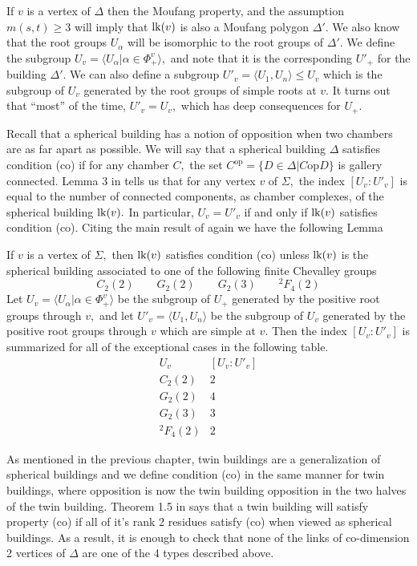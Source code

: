 \documentclass[class=book, crop=false,12 pt]{standalone}
\begin{document}
If $v$ is a vertex of $\Delta$ then the Moufang property, and the assumption $m(s,t)\ge 3$ will imply that $\mathrm{lk}(v)$ is also a Moufang polygon $\Delta'.$ We also know that the root groups $U_\alpha$ will be isomorphic to the root groups of $\Delta'.$ We define the subgroup $U_v=\langle U_\alpha|\alpha\in \Phi_+^v\rangle,$ and note that it is the corresponding $U'_+$ for the building $\Delta'.$ We can also define a subgroup $U'_v=\langle U_1,U_n\rangle\le U_v$ which is the subgroup of $U_v$ generated by the root groups of simple roots at $v.$ It turns out that ``most'' of the time, $U'_v=U_v,$ which has deep consequences for $U_+.$

Recall that a spherical building has a notion of opposition when two chambers are as far apart as possible. We will say that a spherical building $\Delta$ satisfies condition (co) if for any chamber $C,$ the set $C^\text{op}=\{D\in \Delta|C\mathrm{ op }D\}$ is gallery connected. Lemma 3 in \cite{cop} tells us that for any vertex $v$ of $\Sigma,$ the index $[U_v:U'_v]$ is equal to the number of connected components, as chamber complexes, of the spherical building $\mathrm{lk}(v).$ In particular, $U_v=U'_v$ if and only if $\mathrm{lk}(v)$ satisfies condition (co). Citing the main result of \cite{cop} again we have the following Lemma

\begin{lemma}
	\label{lem:index}
	If $v$ is a vertex of $\Sigma,$ then $\mathrm{lk}(v)$ satisfies condition (co) unless $\mathrm{lk}(v)$ is the spherical building associated to one of the following finite Chevalley groups
	\[
		C_2(2)\qquad G_2(2) \qquad G_2(3) \qquad {}^2F_4(2)
	\]
	Let $U_v=\langle U_\alpha|\alpha\in \Phi_+^v\rangle$ be the subgroup of $U_+$ generated by the positive root groups through $v,$ and let $U'_v=\langle U_1,U_n\rangle$ be the subgroup of $U_v$ generated by the positive root groups through $v$ which are simple at $v.$ Then the index $[U_v:U'_v]$ is summarized for all of the exceptional cases in the following table.
	\[
		\begin{array}{c|c}
			U_v&[U_v:U'_v]\\\hline
			C_2(2)&2\\
			G_2(2)&4\\
			G_2(3)&3\\
			{}^2F_4(2)&2
		\end{array}
	\]
\end{lemma}

As mentioned in the previous chapter, twin buildings are a generalization of spherical buildings and we define condition (co) in the same manner for twin buildings, where opposition is now the twin building opposition in the two halves of the twin building. Theorem 1.5 in \cite{globalco} says that a twin building will satisfy property (co) if all of it's rank 2 residues satisfy (co) when viewed as spherical buildings. As a result, it is enough to check that none of the links of co-dimension 2 vertices of $\Delta$ are one of the 4 types described above.
\end{document}
